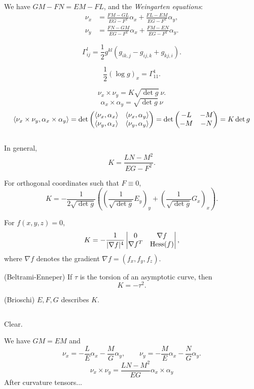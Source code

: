 \documentclass{../note}
\def\a{\alpha}
\begin{document}
\begin{cor}
We have $GM-FN=EM-FL$, and the \emph{Weingarten equations}:
\begin{align*}
\nu_x&=\frac{FM-GL}{EG-F^2}\a_x+\frac{FL-EM}{EG-F^2}\a_y,\\
\nu_y&=\frac{FN-GM}{EG-F^2}\a_x+\frac{FM-EN}{EG-F^2}\a_y.
\end{align*}
\end{cor}



\begin{thm}
\[\Gamma_{ij}^l=\frac12g^{kl}(g_{ik,j}-g_{ij,k}+g_{kj,i}).\]
\end{thm}

\[\frac12(\log g)_x=\Gamma_{11}^1.\]

\[\nu_x\times\nu_y=K\sqrt{\det g}\ \nu.\]
\[\a_x\times\a_y=\sqrt{\det g}\ \nu\]
\[\<\nu_x\times\nu_y,\a_x\times\a_y\>=\det\mat{\<\nu_x,\a_x\>&\<\nu_x,\a_y\>\\\<\nu_y,\a_x\>&\<\nu_y,\a_y\>}=\det\mat{-L&-M\\-M&-N}=K\det g\]











\begin{thm}
$ $\\[-12pt]
\begin{parts}
\item
In general,
\[K=\frac{LN-M^2}{EG-F^2}.\]
\item
For orthogonal coordinates such that $F\equiv0$,
\[K=-\frac1{2\sqrt{\det g}}\left((\frac1{\sqrt{\det g}}E_y)_y+(\frac1{\sqrt{\det g}}G_x)_x\right).\]
\item
For $f(x,y,z)=0$,
\[K=-\frac1{|\nabla f|^4}\mat[v]{0&\nabla f\\\nabla f^T&\Hess(f)},\]
where $\nabla f$ denotes the gradient $\nabla f=(f_x,f_y,f_z)$.
\item(Beltrami-Enneper) If $\tau$ is the torsion of an asymptotic curve, then
\[K=-\tau^2.\]
\item(Brioschi) $E,F,G$ describes $K$.
\end{parts}
\end{thm}

\begin{pf}$ $\\[-12pt]
\begin{parts}
\item Clear.
\item
We have $GM=EM$ and
\[\nu_x=-\frac LE\a_x-\frac MG\a_y,\qquad\nu_y=-\frac ME\a_x-\frac NG\a_y.\]
\[\nu_x\times\nu_y=\frac{LN-M^2}{EG}\a_x\times\a_y\]
After curvature tensors...
\end{parts}
\end{pf}
\end{document}

